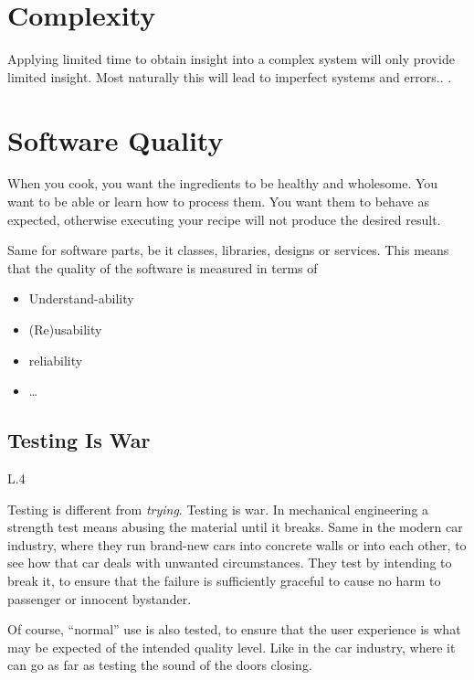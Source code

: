 \documentclass[\docroot/main]{subfiles}
\begin{document}
\section{Complexity}
Applying limited time to obtain insight into a complex system will only provide limited insight.
Most naturally this will lead to imperfect systems and errors.\cite{vig2006}.
.

\section{Software Quality}
When you cook, you want the ingredients to be healthy and wholesome.
You want to be able or learn how to process them. You want them to
behave as expected, otherwise executing your recipe will not  produce
the desired result. 

Same for software parts, be it classes, libraries, designs or services.
This means that the quality of the software is measured in terms of
\begin{itemize}
\item Understand-ability
\item (Re)usability
\item reliability
\item \ldots
\end{itemize}

\subsection{Testing Is War}
\begin{wrapfigure}{L}{.4\textwidth}
\end{wrapfigure}
Testing is different from \textit{trying}. Testing is war. In mechanical
engineering a strength test means abusing the material until it breaks. Same in the
modern car industry, where they run brand-new cars into concrete walls
or into each other, to see how that car deals with unwanted circumstances.
They test by intending to break it, to ensure that the failure is
sufficiently graceful to cause no harm to passenger or innocent bystander.


Of course, ``normal'' use is also tested, to ensure that the user
experience is what may be expected of the intended quality level. Like in the car industry, where it can go as far as testing the sound of the doors closing.
\end{document}
